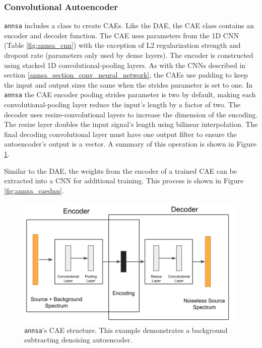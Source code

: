 \subsubsection{Convolutional Autoencoder}

\verb|annsa| includes a class to create CAEs. Like the DAE, the CAE class contains an encoder and decoder function. The CAE uses parameters from the 1D CNN (Table \ref{fig:annsa_cnn}) with the exception of L2 regularization strength and dropout rate (parameters only used by dense layers). The encoder is constructed using stacked 1D convolutional-pooling layers. As with the CNNs described in section \ref{annsa_section_conv_neural_network}, the CAEs use padding to keep the input and output sizes the same when the strides parameter is set to one. In \verb|annsa| the CAE encoder pooling strides parameter is two by default, making each convolutional-pooling layer reduce the input's length by a factor of two. The decoder uses resize-convolutional layers to increase the dimension of the encoding. The resize layer doubles the input signal's length using bilinear interpolation. The final decoding convolutional layer must have one output filter to ensure the autoencoder's output is a vector. A summary of this operation is shown in Figure \ref{fig:annsa_cae}.

Similar to the DAE, the weights from the encoder of a trained CAE can be extracted into a CNN for additional training. This process is shown in Figure \ref{fig:annsa_caednn}.

\begin{figure}[H]
\centering
\includegraphics[trim=0 0 30 0,clip,width=1.0\linewidth]{images/annsa_cae.png}
\caption{\texttt{annsa}'s CAE structure. This example demonstrates a background subtracting denoising autoencoder.}
\label{fig:annsa_cae}
\end{figure}

